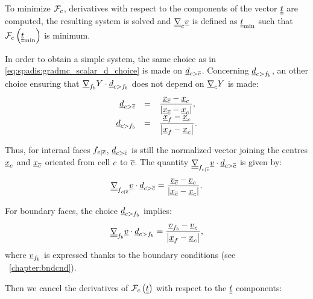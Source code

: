 To minimize $\mathcal{F}_{\celli}$, derivatives with respect to the components of the
vector $\variat$ are computed, the resulting system is solved and $\gradt_\celli \variav$ is defined
as $\variat_{\min}$ such that $\mathcal{F}_{\celli} \left( \variat_{\min}\right)$ is minimum.

In order to obtain a simple system, the same choice as in \eqref{eq:spadis:gradmc_scalar_d_choice} is made on $\vect{d}_{\bij}$.
Concerning $\vect{d}_\ib$, an other choice ensuring that $\grad_{\fib} \varia   \cdot \vect{d}_\ib $ does not
depend on $\grad_{\celli} \varia $ is made:
%
\begin{equation}\label{eq:spadis:gradmv_scalar_d_choice}
\begin{array}{r c l}
\vect{d}_{\bij} &=& \dfrac{\centj - \centi}{\norm{\centj - \centi}}, \\
\vect{d}_\ib &=& \dfrac{\centf - \centi}{\norm{\centf - \centi}} .
\end{array}
\end{equation}

Thus, for internal faces $\fij$, $\vect{d}_{\bij}$ is still the normalized vector joining
the centres $\centi$ and $\centj$ oriented from cell $\celli$ to $\cellj$.
The quantity  $\gradt_{\fij} \variav   \cdot \vect{d}_{\bij}$ is given by:
\begin{equation}
\gradt_{\fij} \variav   \cdot \vect{d}_{\bij} =\dfrac{\variav_{\cellj} - \variav_{\celli} }{\norm{\centj - \centi}}.
\end{equation}

For boundary faces, the choice $\vect{d}_\ib$ implies:
\begin{equation}
\gradt_{\fib} \variav   \cdot \vect{d}_\ib =\dfrac{\variav_{\fib} - \variav_{\celli} }{\norm{\centf - \centi}},
\end{equation}
where $\variav_{\fib}$ is expressed thanks to the boundary conditions (see \chaptername~\ref{chapter:bndcnd}).

Then we cancel the derivatives of
$\mathcal{F}_{\celli} \left( \variat \right)$ with respect to the $ \variat$ components:



